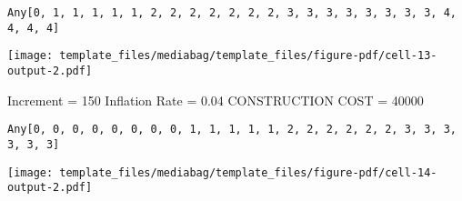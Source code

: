 \documentclass[
  11pt,
]{article}
\begin{document}
\begin{verbatim}
Any[0, 1, 1, 1, 1, 1, 2, 2, 2, 2, 2, 2, 2, 3, 3, 3, 3, 3, 3, 3, 3, 4, 4, 4, 4]
\end{verbatim}

\texttt{[image: template\_files/mediabag/template\_files/figure-pdf/cell-13-output-2.pdf]}

Increment = 150 Inflation Rate = 0.04 CONSTRUCTION COST = 40000

\begin{verbatim}
Any[0, 0, 0, 0, 0, 0, 0, 0, 1, 1, 1, 1, 1, 2, 2, 2, 2, 2, 2, 3, 3, 3, 3, 3, 3]
\end{verbatim}

\texttt{[image: template\_files/mediabag/template\_files/figure-pdf/cell-14-output-2.pdf]}
\end{document}
